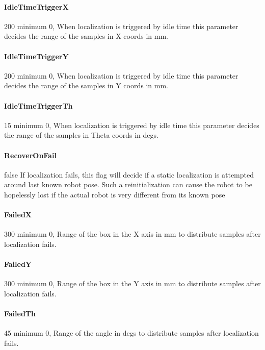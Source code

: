 \documentclass{article}
\begin{document}
\paragraph{IdleTimeTriggerX} 200      minimum 0,  When localization is triggered by idle
                          time this parameter decides the range of the samples
                          in X coords in mm.

\paragraph{IdleTimeTriggerY} 200      minimum 0,  When localization is triggered by idle
                          time this parameter decides the range of the samples
                          in Y coords in mm.

\paragraph{IdleTimeTriggerTh} 15      minimum 0,  When localization is triggered by idle
                          time this parameter decides the range of the samples
                          in Theta coords in degs.

\paragraph{RecoverOnFail} false       If localization fails, this flag will decide if a
                          static localization is attempted around last known
                          robot pose. Such a reinitialization can cause the
                          robot to be hopelessly lost if the actual robot is
                          very different from its known pose

\paragraph{FailedX} 300               minimum 0,  Range of the box in the X axis in mm to
                          distribute samples after localization fails.

\paragraph{FailedY} 300               minimum 0,  Range of the box in the Y axis in mm to
                          distribute samples after localization fails.

\paragraph{FailedTh} 45               minimum 0,  Range of the angle in degs to distribute
                          samples after localization fails.
\end{document}
